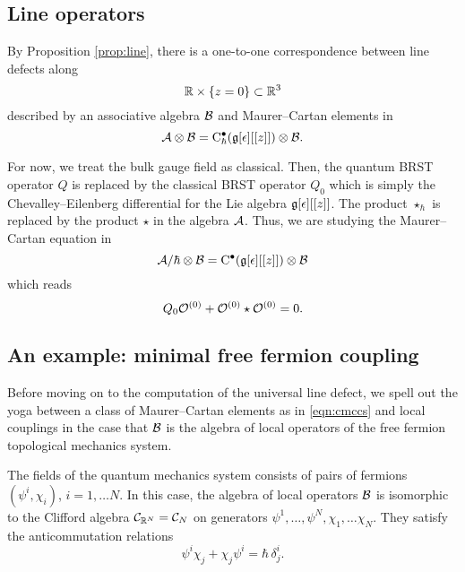 \documentclass[11pt]{amsart}
\begin{document}
\subsection{Line operators}

By Proposition \ref{prop:line}, there is a one-to-one correspondence between line defects along
\[
\mathbb R \times \{z=0\} \subset \mathbb R^3 
\]
described by an associative algebra $\mathcal B$ and Maurer--Cartan elements in 
\begin{equation}\label{eqn:criticalobs}
\mathcal A \otimes \mathcal B = {\rm C}_\hbar^\bullet(\mathfrak g[\epsilon][[z]]) \otimes \mathcal B .
\end{equation}


For now, we treat the bulk gauge field as classical.
Then, the quantum BRST operator $Q$ is replaced by the classical BRST operator $Q_0$ which is simply the Chevalley--Eilenberg differential for the Lie algebra $\mathfrak g[\epsilon][[z]]$.
The product $\star_\hbar$ is replaced by the product $\star$ in the algebra $\mathcal A$. 
Thus, we are studying the Maurer--Cartan equation in
\[
\mathcal A / \hbar \otimes \mathcal B = {\rm C}^\bullet(\mathfrak g[\epsilon][[z]]) \otimes \mathcal B
\]
which reads
\begin{equation}\label{eqn:cmccs}
Q_0 \mathcal O^{(0)} + \mathcal O^{(0)} \star \mathcal O^{(0)} = 0 .
\end{equation}

\subsection{An example: minimal free fermion coupling}

Before moving on to the computation of the universal line defect, we spell out the yoga between a class of Maurer--Cartan elements as in \eqref{eqn:cmccs} and local couplings in the case that $\mathcal B$ is the algebra of local operators of the free fermion topological mechanics system. 

The fields of the quantum mechanics system consists of pairs of fermions $(\psi^i, \chi_i)$, $i=1,\ldots N$. 
In this case, the algebra of local operators $\mathcal B$ is isomorphic to the Clifford algebra $\mathcal C_{\mathbb R^N} = \mathcal C_N$ on generators $\psi^1,\ldots, \psi^N, \chi_1,\ldots \chi_N$. 
They satisfy the anticommutation relations 
\[
\psi^i \chi_j + \chi_j \psi^i = \hbar\, \delta^i_j .
\]
\end{document}
